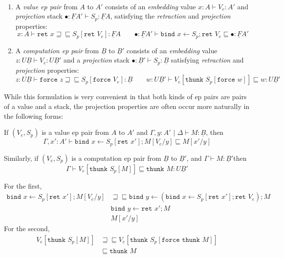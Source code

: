\documentclass[acmsmall,screen,12pt]{acmart}
\renewcommand{\u}{\underline}
\newcommand{\pipe}{\,\,|\,\,}
\newcommand{\ltdyn}{\sqsubseteq}
\newcommand{\gtdyn}{\sqsupseteq}
\newcommand{\equidyn}{\mathrel{\gtdyn\ltdyn}}
\newcommand{\bindXtoYinZ}[2]{\kw{bind}#2 \leftarrow #1;}
\newcommand{\kw}[1]{\texttt{#1}\,\,}
\newcommand{\ret}{\kw{ret}}
\newcommand{\thunk}{\kw{thunk}}
\newcommand{\force}{\kw{force}}
\begin{document}
\begin{definition} ~~ \label{def:cbpvstar-eppairs}
  \begin{enumerate}
  \item 
  A \emph{value ep pair} from $A$ to $A'$ consists of
  an \emph{embedding} value $x:A\vdash V_e : A'$
  and \emph{projection} stack $\bullet : \u F A' \vdash S_p : \u F A$,
  satisfying the \emph{retraction} and \emph{projection} properties:
    \[
    x : A \vdash \ret x \equidyn S_p[\ret V_e] : \u F A
    \qquad
    \bullet : \u F A' \vdash \bindXtoYinZ {S_p} x \ret V_e \ltdyn \bullet : \u F A'
    \]
  \item 
  A \emph{computation ep pair} from $\u B$ to $\u B'$ consists of
  an \emph{embedding} value $z : U \u B \vdash V_e : U \u B'$
  and a \emph{projection} stack $\bullet : \u B' \vdash S_p : \u B$
  satisfying \emph{retraction} and \emph{projection} properties:
    \[
    z : U \u B \vdash \force z \equidyn S_p[\force V_e] : \u B
    \qquad
    w : U \u B' \vdash V_e[\thunk {S_p[\force w]}] \ltdyn w : U \u B'
    \]
  \end{enumerate}
\end{definition}

\begin{longonly}
While this formulation is very convenient in that both kinds of ep
pairs are pairs of a value and a stack, the projection properties are
often occur more naturally in the following forms:
\begin{lemma}
  If $(V_e,S_p)$ is a value ep pair from $A$ to $A'$ and $\Gamma,
  y:A'\pipe\Delta \vdash M : \u B$, then
  \[ \Gamma , x' : A' \vdash \bindXtoYinZ {S_p[\ret x']} x M[V_e/y] \ltdyn M[x'/y] \]

  Similarly, if $(V_e,S_p)$ is a computation ep pair from $\u B$ to
  $\u B'$, and $\Gamma \vdash M : \u B'$then
  \[ \Gamma \vdash V_e[\thunk S_p[M]] \ltdyn \thunk M : U \u B' \]
\end{lemma}
\begin{longproof}
  For the first,
  \begin{align*}
    \bindXtoYinZ {S_p[\ret x']} x M[V_e/y]
    & \equidyn
    \bindXtoYinZ {(\bindXtoYinZ {S_p[\ret x']} x \ret V_e)} y M\tag{comm conv, $\u F \beta$}\\
    &\bindXtoYinZ {\ret x'} y M\tag{projection}\\
    &M[x'/y]\tag{$\u F\beta$}
  \end{align*}
  For the second,
  \begin{align*}
    V_e[\thunk S_p[M]]
    &\equidyn V_e[\thunk S_p[\force\thunk M]] \tag{$U\beta$}\\
    &\ltdyn \thunk M\tag{projection}
  \end{align*}
\end{longproof}
\end{longonly}
\end{document}
